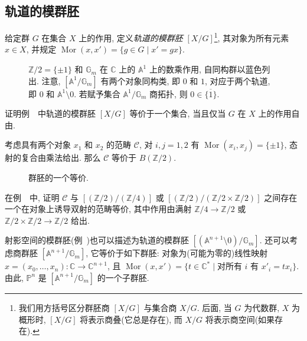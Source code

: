 \subsection{轨道的模群胚}\label{src:1.4.2-subsection}
\begin{example}[轨道的模群胚]\label{src:1.4.6}
给定群 $G$ 在集合 $X$ 上的作用, 定义\textit{轨道的模群胚} $[X/G]$\footnote{我们用方括号区分群胚商 $[X/G]$ 与集合商 $X/G$. 后面, 当 $G$ 为代数群, $X$ 为概形时, $[X/G]$ 将表示商叠(它总是存在), 而 $X/G$ 将表示商空间(如果存在).}, 其对象为所有元素 $x\in X$, 并规定 $\operatorname{Mor}(x,x')=\{g\in G\mid x'=gx\}$.
\end{example}
\begin{figure}[htbp]
\centering
\caption{$\mathbb Z/2=\{\pm1\}$ 和 $\mathbb G_m$ 在 $\mathbb C$ 上的 $\mathbb A^1$ 上的数乘作用, 自同构群以蓝色列出. 注意, $[\mathbb A^1/\mathbb G_m]$ 有两个对象同构类, 即 $0$ 和 $1$, 对应于两个轨道, 即 $0$ 和 $\mathbb A^1\setminus0$. 若赋予集合 $\mathbb A^1/\mathbb G_m$ 商拓扑, 则 $0\in\overline{\{1\}}$.}\label{src:1.4.7}
\end{figure}
\begin{exercise}[简单]\label{src:1.4.8}
证明例~~中轨道的模群胚 $[X/G]$ 等价于一个集合, 当且仅当 $G$ 在 $X$ 上的作用自由.
\end{exercise}
\begin{example}\label{src:1.4.9}
考虑具有两个对象 $x_1$ 和 $x_2$ 的范畴 $\mathcal C$, 对 $i,j=1,2$ 有 $\operatorname{Mor}(x_i,x_j)=\{\pm1\}$, 态射的复合由乘法给出. 那么 $\mathcal C$ 等价于 $B(\mathbb Z/2)$.
\end{example}
\begin{figure}[htbp]
\centering
\caption{群胚的一个等价.}\label{src:1.4.10}
\end{figure}
\begin{exercise}[简单]\label{src:1.4.11}
在例~~中, 证明 $\mathcal C$ 与 $[(\mathbb Z/2)/(\mathbb Z/4)]$ 或 $[(\mathbb Z/2)/(\mathbb Z/2\times\mathbb Z/2)]$ 之间存在一个在对象上诱导双射的范畴等价, 其中作用由满射 $\mathbb Z/4\to\mathbb Z/2$ 或 $\mathbb Z/2\times\mathbb Z/2\to\mathbb Z/2$ 给出.
\end{exercise}
\begin{example}[射影空间作为商]\label{src:1.4.12}
射影空间的模群胚(例~)也可以描述为轨道的模群胚 $[(\mathbb A^{n+1}\setminus0)/\mathbb G_m]$. 还可以考虑商群胚 $[\mathbb A^{n+1}/\mathbb G_m]$, 它等价于如下群胚: 对象为(可能为零的)线性映射 $x=(x_0,\ldots,x_n):\mathbb C\to\mathbb C^{n+1}$, 且 $\operatorname{Mor}(x,x')=\{t\in\mathbb C^*\mid\text{对所有 }i\text{ 有 }x'_i=tx_i\}$. 由此, $\mathbb P^n$ 是 $[\mathbb A^{n+1}/\mathbb G_m]$ 的一个子群胚.
\end{example}
